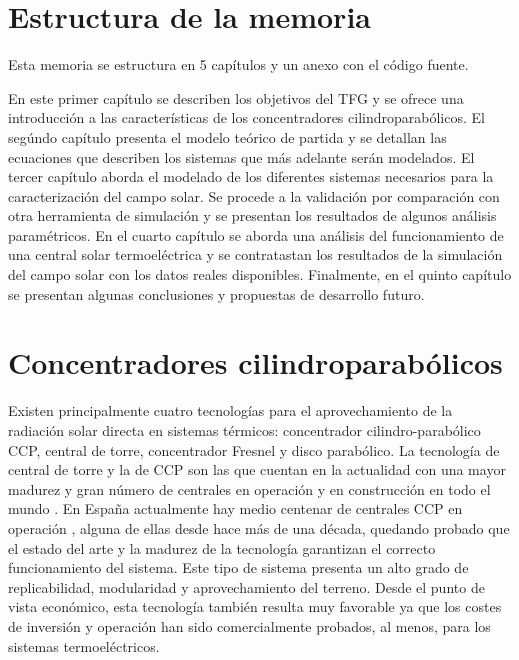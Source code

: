 \section{Estructura de la memoria}
Esta memoria se estructura en 5 capítulos y un anexo con el código fuente.

En este primer capítulo se describen los objetivos del TFG y se ofrece una introducción a las características de los concentradores cilindroparabólicos. 
El segúndo capítulo presenta el modelo teórico de partida y se detallan las ecuaciones que describen los sistemas que más adelante serán modelados.
El tercer capítulo aborda el modelado de los diferentes sistemas necesarios para la caracterización del campo solar. Se procede a la validación por comparación con otra herramienta de simulación y se presentan los resultados de algunos análisis paramétricos.
En el cuarto capítulo se aborda una análisis del funcionamiento de una central solar termoeléctrica y se contratastan los resultados de la simulación del campo solar con los datos reales disponibles.
Finalmente, en el quinto capítulo se presentan algunas conclusiones y propuestas de desarrollo futuro.

\section{Concentradores cilindroparabólicos}

Existen principalmente cuatro tecnologías para el aprovechamiento de la radiación solar directa en sistemas térmicos: concentrador cilindro-parabólico CCP, central de torre, concentrador Fresnel y disco parabólico. La tecnología de central de torre y la de CCP son las que cuentan en la actualidad con una mayor madurez y gran número de centrales en operación y en construcción en todo el mundo \cite{islamComprehensiveReviewStateoftheart2018}. En España actualmente hay medio centenar de centrales CCP en operación \cite{Protermosolar}, alguna de ellas desde hace más de una década, quedando probado que el estado del arte y la madurez de la tecnología garantizan el correcto funcionamiento del sistema. Este tipo de sistema presenta un alto grado de replicabilidad, modularidad y aprovechamiento del terreno. Desde el punto de vista económico, esta tecnología también resulta muy favorable ya que los costes de inversión y operación han sido comercialmente probados, al menos, para los sistemas termoeléctricos.

